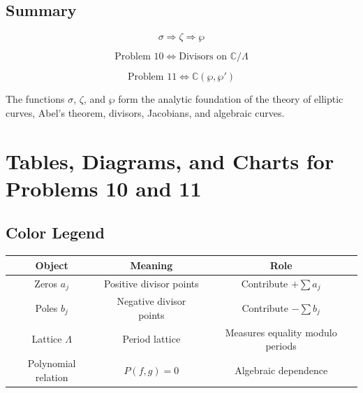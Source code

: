 \documentclass[12pt,a4paper]{article}
\theoremstyle{notespace}
\begin{document}
\begin{center}
\end{center}

\subsection{Summary}

\[
\boxed{
	\sigma
	\Rightarrow
	\zeta
	\Rightarrow
	\wp
}
\]

\[
\boxed{
	\text{Problem 10}
	\Longleftrightarrow
	\text{Divisors on } \mathbb C/\Lambda
}
\]

\[
\boxed{
	\text{Problem 11}
	\Longleftrightarrow
	\mathbb C(\wp,\wp')
}
\]

The functions \(\sigma\), \(\zeta\), and \(\wp\) form the analytic foundation of the theory of elliptic curves, Abel's theorem, divisors, Jacobians, and algebraic curves.

\section{Tables, Diagrams, and Charts for Problems 10 and 11}

\subsection{Color Legend}

\begin{center}
	\renewcommand{\arraystretch}{1.35}
	\begin{tabular}{|c|c|c|}
		\hline
		\rowcolor{blue!15}
		Object & Meaning & Role \\
		\hline
		\cellcolor{green!15} Zeros \(a_j\) & Positive divisor points & Contribute \(+\sum a_j\) \\
		\hline
		\cellcolor{red!15} Poles \(b_j\) & Negative divisor points & Contribute \(-\sum b_j\) \\
		\hline
		\cellcolor{yellow!20} Lattice \(\Lambda\) & Period lattice & Measures equality modulo periods \\
		\hline
		\cellcolor{purple!15} Polynomial relation & \(P(f,g)=0\) & Algebraic dependence \\
		\hline
	\end{tabular}
\end{center}
\end{document}
